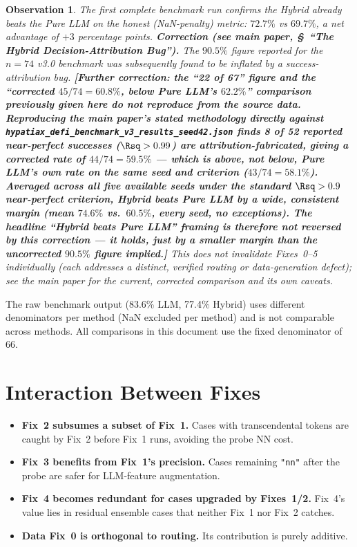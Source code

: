 \documentclass[twoside,11pt]{article}
\newtheorem{observation}{Observation}
\begin{document}
\begin{observation}
The first complete benchmark run confirms the Hybrid already
\emph{beats} the Pure LLM on the honest (NaN-penalty) metric:
$72.7\%$ vs $69.7\%$, a net advantage of $+3$ percentage points.
\textbf{Correction (see main paper, \S~``The Hybrid Decision-Attribution
Bug'').} The $90.5\%$ figure reported for the $n=74$ v3.0 benchmark was
subsequently found to be inflated by a success-attribution bug.
\textbf{[Further correction: the ``22 of 67'' figure and the ``corrected
$45/74=60.8\%$, below Pure LLM's $62.2\%$'' comparison previously given
here do not reproduce from the source data. Reproducing the main paper's
stated methodology directly against
\texttt{hypatiax\_defi\_benchmark\_v3\_results\_seed42.json} finds 8 of
52 reported near-perfect successes ($\Rsq>0.99$) are attribution-fabricated,
giving a corrected rate of $44/74=59.5\%$ --- which is
\emph{above}, not below, Pure LLM's own rate on the same seed and
criterion ($43/74=58.1\%$). Averaged across all five available seeds
under the standard $\Rsq>0.9$ near-perfect criterion, Hybrid beats Pure
LLM by a wide, consistent margin (mean $74.6\%$ vs.\ $60.5\%$, every
seed, no exceptions). The headline ``Hybrid beats Pure LLM'' framing
is therefore not reversed by this correction --- it holds, just by a
smaller margin than the uncorrected $90.5\%$ figure implied.]} This
does not invalidate Fixes~0--5 individually (each addresses a distinct,
verified routing or data-generation defect); see the main paper for the
current, corrected comparison and its own caveats.
\end{observation}

\begin{remark}
The raw benchmark output (83.6\% LLM, 77.4\% Hybrid) uses different
denominators per method (NaN excluded per method) and is not comparable
across methods.  All comparisons in this document use the fixed denominator
of 66.
\end{remark}

\section{Interaction Between Fixes}
\label{sec:interactions}

\begin{itemize}[leftmargin=*]
  \item \textbf{Fix~2 subsumes a subset of Fix~1.}  Cases with transcendental
    tokens are caught by Fix~2 before Fix~1 runs, avoiding the probe NN cost.
  \item \textbf{Fix~3 benefits from Fix~1's precision.}  Cases remaining
    \texttt{"nn"} after the probe are safer for LLM-feature augmentation.
  \item \textbf{Fix~4 becomes redundant for cases upgraded by Fixes~1/2.}
    Fix~4's value lies in residual ensemble cases that neither Fix~1 nor
    Fix~2 catches.
  \item \textbf{Data Fix~0 is orthogonal to routing.}  Its contribution
    is purely additive.
\end{itemize}
\end{document}

